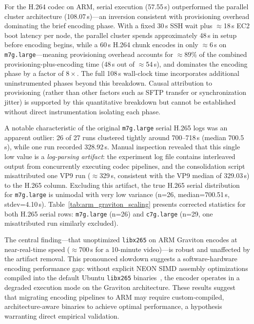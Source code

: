 \documentclass[conference]{IEEEtran}
\begin{document}
For the H.264 codec on ARM, serial execution (57.55\,s) outperformed the parallel cluster architecture (108.07\,s)---an inversion consistent with provisioning overhead dominating the brief encoding phase. With a fixed 30\,s SSH wait plus $\approx$18\,s EC2 boot latency per node, the parallel cluster spends approximately 48\,s in setup before encoding begins, while a 60\,s H.264 chunk encodes in only $\approx$6\,s on \texttt{m7g.large}---meaning provisioning overhead accounts for $\approx$89\% of the combined provisioning-plus-encoding time (48\,s out of $\approx$54\,s), and dominates the encoding phase by a factor of $8\times$. The full 108\,s wall-clock time incorporates additional uninstrumented phases beyond this breakdown. Causal attribution to provisioning (rather than other factors such as SFTP transfer or synchronization jitter) is supported by this quantitative breakdown but cannot be established without direct instrumentation isolating each phase.

A notable characteristic of the original \texttt{m7g.large} serial H.265 logs was an apparent outlier: 26 of 27 runs clustered tightly around 700--718\,s (median 700.5\,s), while one run recorded 328.92\,s. Manual inspection revealed that this single low value is a \textit{log-parsing artifact}: the experiment log file contains interleaved output from concurrently executing codec pipelines, and the consolidation script misattributed one VP9 run ($\approx$329\,s, consistent with the VP9 median of 329.03\,s) to the H.265 column. Excluding this artifact, the true H.265 serial distribution for \texttt{m7g.large} is unimodal with very low variance (n=26, median=700.51\,s, stdev=4.10\,s). Table~\ref{tab:arm_graviton_scaling} presents corrected statistics for both H.265 serial rows: \texttt{m7g.large} (n=26) and \texttt{c7g.large} (n=29, one misattributed run similarly excluded).

The central finding---that unoptimized \texttt{libx265} on ARM Graviton encodes at near-real-time speed ($\approx$700\,s for a 10-minute video)---is robust and unaffected by the artifact removal. This pronounced slowdown suggests a software-hardware encoding performance gap: without explicit NEON SIMD assembly optimizations compiled into the default Ubuntu \texttt{libx265} binaries~\cite{neonvideo}, the encoder operates in a degraded execution mode on the Graviton architecture. These results suggest that migrating encoding pipelines to ARM may require custom-compiled, architecture-aware binaries to achieve optimal performance, a hypothesis warranting direct empirical validation.
\end{document}
